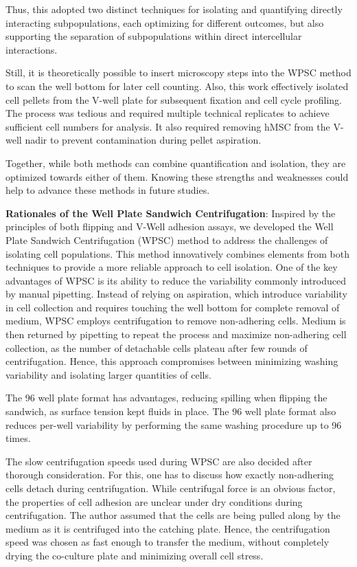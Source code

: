 Thus, this adopted two distinct techniques for isolating and quantifying
directly interacting subpopulations, each optimizing for different outcomes, but
also supporting the separation of subpopulations within direct intercellular
interactions.

Still, it is theoretically possible to insert microscopy steps into the
\ac{WPSC} method to scan the well bottom for later cell counting. Also, this
work effectively isolated cell pellets from the V-well plate for subsequent
fixation and cell cycle profiling. The process was
tedious and required multiple technical replicates to achieve sufficient cell
numbers for analysis. It also required removing \ac{hMSC} from the V-well nadir
to prevent contamination during pellet aspiration.

Together, while both methods can combine quantification and isolation, they
are optimized towards either of them. Knowing these strengths and weaknesses
could help to advance these methods in future studies.





\textbf{Rationales of the Well Plate Sandwich Centrifugation}: Inspired by the
principles of both flipping and V-Well adhesion assays, we developed the Well
Plate Sandwich Centrifugation (\acf{WPSC}) method to address the challenges of
isolating cell populations. This method innovatively combines elements from both
techniques to provide a more reliable approach to cell isolation. One of the key
advantages of WPSC is its ability to reduce the variability commonly introduced
by manual pipetting. Instead of relying on aspiration, which introduce
variability in cell collection and requires touching the well bottom for
complete removal of medium, WPSC employs centrifugation to remove non-adhering
cells. Medium is then returned by pipetting to repeat the process and maximize
non-adhering cell collection, as the number of detachable cells plateau after
few rounds of centrifugation. Hence, this approach compromises
between minimizing washing variability and isolating larger quantities of cells.

The 96 well plate format has advantages, reducing spilling when flipping the
sandwich, as surface tension kept fluids in place. The 96 well plate format also
reduces per-well variability by performing the same washing procedure up to 96
times.

The slow centrifugation speeds used during \ac{WPSC} are also decided after
thorough consideration. For this, one has to discuss how exactly
non-adhering cells detach during centrifugation. While centrifugal force is an
obvious factor, the properties of cell adhesion are unclear under dry conditions
during centrifugation. The author assumed that the cells are being pulled along
by the medium as it is centrifuged into the catching plate. Hence, the centrifugation
speed was chosen as fast enough to transfer the medium, without completely
drying the co-culture plate and minimizing overall cell stress.

